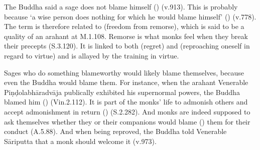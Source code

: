 
The Buddha said a sage does not blame himself () (v.913). This is probably because `a wise person does nothing for which he would blame himself' () (v.778). The term  is therefore related to  (freedom from remorse), which is said to be a quality of an arahant at M.1.108. Remorse is what monks feel when they break their precepts (S.3.120). It is linked to both  (regret) and  (reproaching oneself in regard to virtue) and is allayed by the training in virtue.

Sages who do something blameworthy would likely blame themselves, because even the Buddha would blame them. For instance, when the arahant Venerable Piṇḍolabhāradvāja publically exhibited his supernormal powers, the Buddha blamed him () (Vin.2.112). It is part of the monks' life to admonish others and accept admonishment in return () (S.2.282). And monks are indeed supposed to ask themselves whether they or their companions would blame () them for their conduct (A.5.88). And when being reproved, the Buddha told Venerable Sāriputta that a monk should welcome it (v.973).
